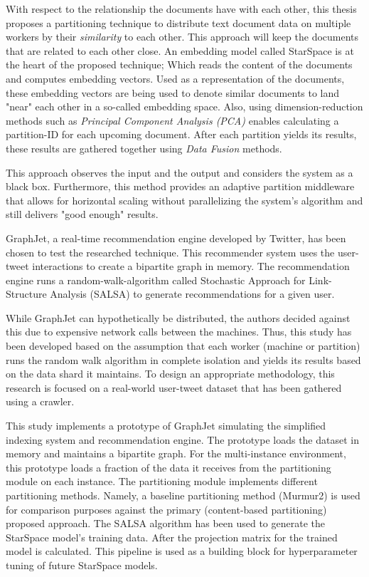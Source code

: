 With respect to the relationship the documents have with each other, this thesis proposes a partitioning technique to distribute text document data on multiple workers by their \emph{similarity} to each other. This approach will keep the documents that are related to each other close. An embedding model called StarSpace is at the heart of the proposed technique; Which reads the content of the documents and computes embedding vectors. Used as a representation of the documents, these embedding vectors are being used to denote similar documents to land "near" each other in a so-called embedding space. Also, using dimension-reduction methods such as \emph{Principal Component Analysis (PCA)} enables calculating a partition-ID for each upcoming document. After each partition yields its results, these results are gathered together using \emph{Data Fusion} methods. 


This approach observes the input and the output and considers the system as a black box. Furthermore, this method provides an adaptive partition middleware that allows for horizontal scaling without parallelizing the system's algorithm and still delivers "good enough" results.


GraphJet, a real-time recommendation engine developed by Twitter, has been chosen to test the researched technique. This recommender system uses the user-tweet interactions to create a bipartite graph in memory. The recommendation engine runs a random-walk-algorithm called Stochastic Approach for Link-Structure Analysis (SALSA) to generate recommendations for a given user. 


While GraphJet can hypothetically be distributed, the authors decided against this due to expensive network calls between the machines. Thus, this study has been developed based on the assumption that each worker (machine or partition) runs the random walk algorithm in complete isolation and yields its results based on the data shard it maintains. To design an appropriate methodology, this research is focused on a real-world user-tweet dataset that has been gathered using a crawler. 


This study implements a prototype of GraphJet simulating the simplified indexing system and recommendation engine. The prototype loads the dataset in memory and maintains a bipartite graph. For the multi-instance environment, this prototype loads a fraction of the data it receives from the partitioning module on each instance. The partitioning module implements different partitioning methods. Namely, a baseline partitioning method (Murmur2) is used for comparison purposes against the primary (content-based partitioning) proposed approach. The SALSA algorithm has been used to generate the StarSpace model's training data. After the projection matrix for the trained model is calculated. This pipeline is used as a building block for hyperparameter tuning of future StarSpace models.


